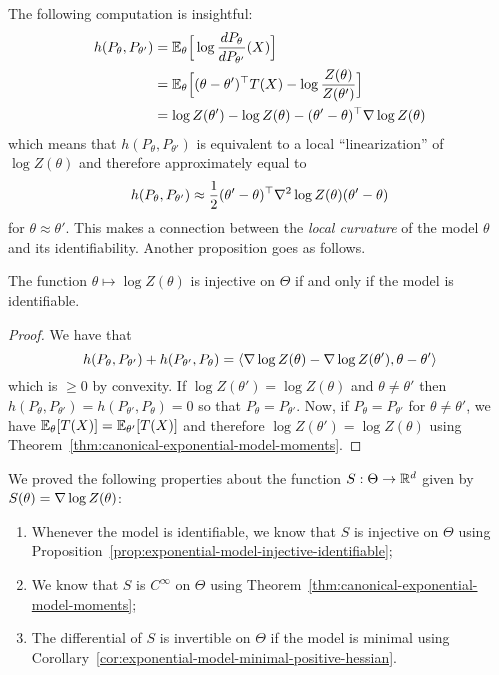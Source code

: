 The following computation is insightful:
\begin{align*}
	h(P_\theta, P_{\theta'}) &= \mathbb E_{\theta} \Big[ \log \frac{d P_\theta}{d P_{\theta'}}(X) \Big] \\
	&= \mathbb E_\theta \Big[ (\theta - \theta')^\top T(X) 
	- \log \frac{Z(\theta)}{Z(\theta')} \Big] \\
	&= \log Z(\theta') - \log Z(\theta) -  (\theta' - \theta)^\top \nabla \log Z(\theta)
\end{align*}
which means that $h(P_\theta, P_{\theta'})$ is equivalent to a local ``linearization'' of $\log Z(\theta)$ and therefore approximately equal to
\begin{equation*}
	h(P_\theta, P_{\theta'}) \approx \frac 12 (\theta' - \theta)^\top \nabla^2 \log Z(\theta) (\theta' - \theta)
\end{equation*}
for $\theta \approx \theta'$. This makes a connection between the \emph{local curvature} of the model $\theta$ and its identifiability.
Another proposition goes as follows.
\begin{proposition}
	\label{prop:exponential-model-injective-identifiable}
	The function $\theta \mapsto \log Z(\theta)$ is injective on $\Theta$ if and only if the model is identifiable.
\end{proposition}
\begin{proof}
	We have that 
	\begin{equation*}
		h(P_\theta, P_{\theta'}) + h(P_{\theta'}, P_{\theta}) = \langle  \nabla \log Z(\theta)  - \nabla \log Z(\theta'), \theta - \theta' \rangle	
	\end{equation*}
	which is $\geq 0$ by convexity.
	If $ \log Z(\theta') =  \log Z(\theta)$ and $\theta \neq \theta'$ then $h(P_\theta, P_{\theta'}) = h(P_{\theta'}, P_\theta) = 0$ so that $P_\theta = P_{\theta'}$. Now, if $P_\theta = P_{\theta'}$ for $\theta \neq \theta'$, we have $\mathbb E_\theta[T(X)] = \mathbb E_{\theta'}[T(X)]$ and therefore $\log Z(\theta') =  \log Z(\theta)$ using Theorem~\ref{thm:canonical-exponential-model-moments}.
\end{proof}
We proved the following properties about the function $S : \Theta \rightarrow \mathbb R^d$ given by $S(\theta) = \nabla \log Z(\theta)$:
\begin{enumerate}
	\item Whenever the model is identifiable, we know that $S$ is injective on $\Theta$ using Proposition~\ref{prop:exponential-model-injective-identifiable};
	\item We know that $S$ is $C^\infty$ on $\Theta$ using Theorem~\ref{thm:canonical-exponential-model-moments};
	\item The differential of $S$ is invertible on $\Theta$ if the model is minimal using Corollary~\ref{cor:exponential-model-minimal-positive-hessian}.
\end{enumerate}
